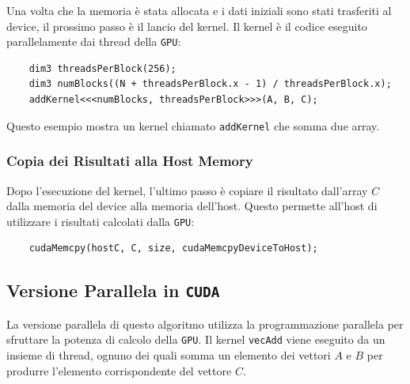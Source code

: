 Una volta che la memoria è stata allocata e i dati iniziali sono stati trasferiti al device, il prossimo passo è il lancio del kernel. Il kernel è il codice eseguito parallelamente dai thread della \texttt{GPU}:

\begin{lstlisting}
    dim3 threadsPerBlock(256);
    dim3 numBlocks((N + threadsPerBlock.x - 1) / threadsPerBlock.x);
    addKernel<<<numBlocks, threadsPerBlock>>>(A, B, C);
\end{lstlisting}

Questo esempio mostra un kernel chiamato \texttt{addKernel} che somma due array.

\subsubsection{Copia dei Risultati alla Host Memory}

Dopo l'esecuzione del kernel, l'ultimo passo è copiare il risultato dall'array \(C\) dalla memoria del device alla memoria dell'host. Questo permette all'host di utilizzare i risultati calcolati dalla \texttt{GPU}:

\begin{lstlisting}
    cudaMemcpy(hostC, C, size, cudaMemcpyDeviceToHost);
\end{lstlisting}

\subsection{Versione Parallela in \texttt{CUDA}}

La versione parallela di questo algoritmo utilizza la programmazione parallela
per sfruttare la potenza di calcolo della \texttt{GPU}. Il kernel \texttt{vecAdd}
viene eseguito da un insieme di thread, ognuno dei quali somma un elemento
dei vettori \(A\) e \(B\) per produrre l'elemento corrispondente del vettore \(C\).

